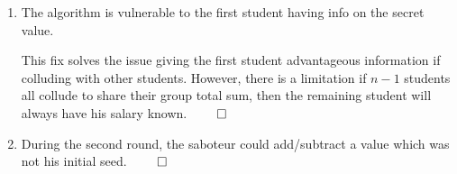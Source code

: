 \documentclass[12pt, a4paper]{article}
\begin{document}
\begin{enumerate}[Q\arabic*.]
\begin{enumerate}[(\alph*.)]
      \item The algorithm is vulnerable to the first student having info on the secret value.
        This fix solves the issue giving the first student advantageous information if colluding with other students. However, there is a limitation if $n-1$ students all collude to share their group total sum, then the remaining student will always have his salary known. $\qed$

      \item During the second round, the saboteur could add/subtract a value which was not his initial seed. $\qed$
    \end{enumerate}
\end{enumerate}
\end{document}
